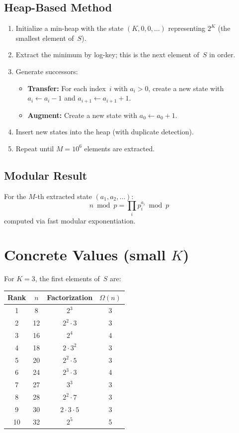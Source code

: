 \documentclass[11pt]{article}
\begin{document}
\subsection{Heap-Based Method}

\begin{enumerate}
\item Initialize a min-heap with the state $(K, 0, 0, \ldots)$ representing $2^K$ (the smallest element of~$S$).
\item Extract the minimum by log-key; this is the next element of~$S$ in order.
\item Generate successors:
    \begin{itemize}
    \item \textbf{Transfer:} For each index~$i$ with $a_i > 0$, create a new state with $a_i \leftarrow a_i - 1$ and $a_{i+1} \leftarrow a_{i+1} + 1$.
    \item \textbf{Augment:} Create a new state with $a_0 \leftarrow a_0 + 1$.
    \end{itemize}
\item Insert new states into the heap (with duplicate detection).
\item Repeat until $M = 10^6$ elements are extracted.
\end{enumerate}

\subsection{Modular Result}

For the $M$-th extracted state $(a_1, a_2, \ldots)$:
\[
n \bmod p = \prod_i p_i^{a_i} \bmod p
\]
computed via fast modular exponentiation.

\section{Concrete Values (small $K$)}

For $K = 3$, the first elements of~$S$ are:

\begin{center}
\begin{tabular}{cccc}
\toprule
Rank & $n$ & Factorization & $\Omega(n)$ \\
\midrule
1  & 8  & $2^3$               & 3 \\
2  & 12 & $2^2 \cdot 3$       & 3 \\
3  & 16 & $2^4$               & 4 \\
4  & 18 & $2 \cdot 3^2$       & 3 \\
5  & 20 & $2^2 \cdot 5$       & 3 \\
6  & 24 & $2^3 \cdot 3$       & 4 \\
7  & 27 & $3^3$               & 3 \\
8  & 28 & $2^2 \cdot 7$       & 3 \\
9  & 30 & $2 \cdot 3 \cdot 5$ & 3 \\
10 & 32 & $2^5$               & 5 \\
\bottomrule
\end{tabular}
\end{center}
\end{document}
